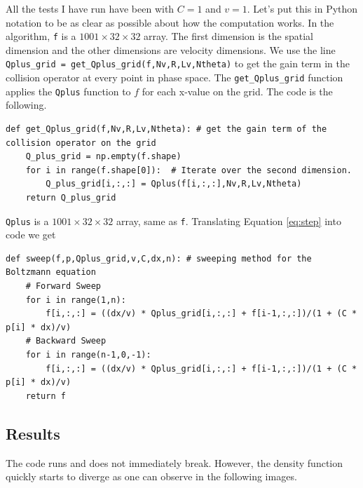 \documentclass{article}
\begin{document}
    All the tests I have run have been with $C=1$ and $v=1$. Let's put this in Python notation to be as clear as possible about how the computation works. In the algorithm, \verb|f| is a $1001 \times 32 \times 32$ array. The first dimension is the spatial dimension and the other dimensions are velocity dimensions. We use the line \verb |Qplus_grid = get_Qplus_grid(f,Nv,R,Lv,Ntheta)| to get the gain term in the collision operator at every point in phase space. The \verb|get_Qplus_grid| function applies the \verb|Qplus| function to $f$ for each x-value on the grid. The code is the following.

\bigskip
\begin{lstlisting}
def get_Qplus_grid(f,Nv,R,Lv,Ntheta): # get the gain term of the collision operator on the grid
    Q_plus_grid = np.empty(f.shape)
    for i in range(f.shape[0]):  # Iterate over the second dimension.
        Q_plus_grid[i,:,:] = Qplus(f[i,:,:],Nv,R,Lv,Ntheta)
    return Q_plus_grid
\end{lstlisting}
\bigskip
\verb|Qplus| is a $1001 \times 32 \times 32$ array, same as \verb|f|. Translating Equation \ref{eq:step} into code we get
\bigskip
\begin{lstlisting}
def sweep(f,p,Qplus_grid,v,C,dx,n): # sweeping method for the Boltzmann equation
    # Forward Sweep
    for i in range(1,n):
        f[i,:,:] = ((dx/v) * Qplus_grid[i,:,:] + f[i-1,:,:])/(1 + (C * p[i] * dx)/v)
    # Backward Sweep
    for i in range(n-1,0,-1):
        f[i,:,:] = ((dx/v) * Qplus_grid[i,:,:] + f[i-1,:,:])/(1 + (C * p[i] * dx)/v)
    return f
\end{lstlisting}

\subsection{Results}

The code runs and does not immediately break. However, the density function quickly starts to diverge as one can observe in the following images.
\bigskip
\end{document}
